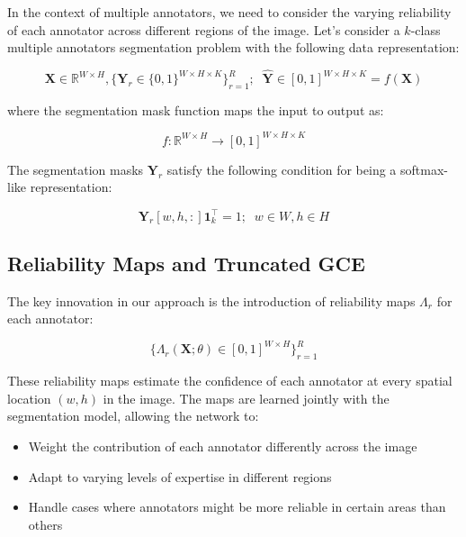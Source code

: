 In the context of multiple annotators, we need to consider the
varying reliability of each annotator across different regions of the
image. Let's consider a $k$-class multiple annotators segmentation
problem with the following data representation:

\begin{equation}
  \mathbf X \in \mathbb{R}^{W \times H}, \{ \mathbf Y_r \in
  \{0,1\}^{W \times H \times K} \}_{r=1}^R; \;\; \mathbf {\hat Y} \in
  [0,1]^{W\times H \times K} = f(\mathbf X)
\end{equation}

where the segmentation mask function maps the input to output as:

\begin{equation}
  f: \mathbb  R ^{W\times H} \to [0,1]^{W\times H\times K}
\end{equation}

The segmentation masks $\mathbf Y_r$ satisfy the following condition
for being a softmax-like representation:

\begin{equation}
  \mathbf Y_r[w,h,:] \mathbf{1} ^ \top _ k = 1; \;\; w \in W, h \in H
\end{equation}

\subsection{Reliability Maps and Truncated GCE}

The key innovation in our approach is the introduction of reliability
maps $\Lambda_r$ for each annotator:

\begin{equation}
  \bigg\{ \Lambda_r (\mathbf X; \theta ) \in [0,1] ^{W\times H} \bigg\}_{r=1}^R
\end{equation}

These reliability maps estimate the confidence of each annotator at
every spatial location $(w,h)$ in the image. The maps are learned
jointly with the segmentation model, allowing the network to:

\begin{itemize}
  \item Weight the contribution of each annotator differently across the image
  \item Adapt to varying levels of expertise in different regions
  \item Handle cases where annotators might be more reliable in
    certain areas than others
\end{itemize}

